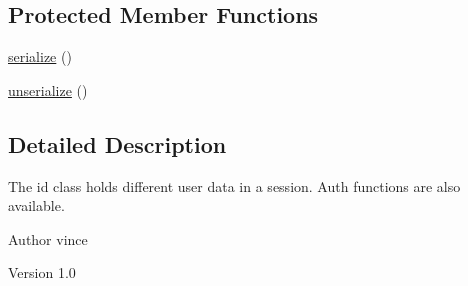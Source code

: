 \subsection*{Protected Member Functions}
\begin{DoxyCompactItemize}
\item 
\hyperlink{class_anemo_1_1_i_d_a4d9813fea8525b19a1d370eeb8fe41d6}{serialize} ()
\item 
\hyperlink{class_anemo_1_1_i_d_a22ab2c3304bb284dd641995a23592c03}{unserialize} ()
\end{DoxyCompactItemize}


\subsection{Detailed Description}
The id class holds different user data in a session. Auth functions are also available. \begin{DoxyAuthor}{Author}
vince 
\end{DoxyAuthor}
\begin{DoxyVersion}{Version}
1.0 
\end{DoxyVersion}


